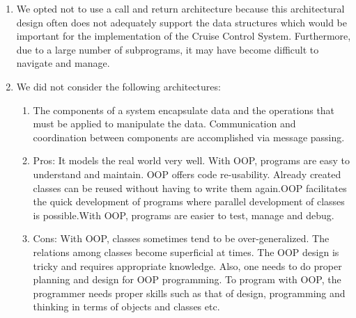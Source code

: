 \documentclass[preprint,11pt,3p]{article}
\begin{document}
\begin{enumerate}
	\item We opted not to use a call and return architecture because this architectural design often does not adequately support the data structures which would be important for the implementation of the Cruise Control System. Furthermore, due to a large number of subprograms, it may have become difficult to navigate and manage. 
	\item We did not consider the following architectures:
		\begin{enumerate} 
			\item The components of a system encapsulate data and the operations that must be applied to manipulate the data. Communication and coordination between components are accomplished via message passing. 
			\item Pros: It models the real world very well. With OOP, programs are easy to understand and maintain. OOP offers code re-usability. Already created classes can be reused without having to write them again.OOP facilitates the quick development of programs where parallel development of classes is possible.With OOP, programs are easier to test, manage and debug.
			\item Cons: With OOP, classes sometimes tend to be over-generalized. The relations among classes become superficial at times. The OOP design is tricky and requires appropriate knowledge. Also, one needs to do proper planning and design for OOP programming. To program with OOP, the programmer needs proper skills such as that of design, programming and thinking in terms of objects and classes etc.
		\end{enumerate} 
\end{enumerate}
\end{document}
